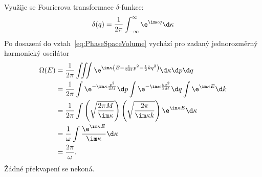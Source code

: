 \begin{solution}
    Využije se Fourierova transformace $\delta$-funkce:
    \begin{equation}
        \delta(q)
            =\frac{1}{2\pi}\int_{-\infty}^{\infty}\e^{\im\kappa q}\d\kappa
    \end{equation}
    Po dosazení do vztah~\eqref{eq:PhaseSpaceVolume} vychází pro zadaný jednorozměrný harmonický oscilátor
    \begin{align}
        \Omega(E)
            &=\frac{1}{2\pi}\iiint\e^{\im\kappa\left(E-\frac{1}{2M}p^{2}-\frac{1}{2}kq^{2}\right)}\d\kappa\d p\d q\nonumber\\
            &=\frac{1}{2\pi}\int\e^{-\im\kappa\frac{p^{2}}{2M}}\d p
                \int\e^{-\im\kappa\frac{kq^{2}}{2M}}\d q
                \int\e^{\im\kappa E}\d k\nonumber\\
            &=\frac{1}{2\pi}\int\left(\sqrt{\frac{2\pi M}{\im\kappa}}\right)
                \left(\sqrt{\frac{2\pi}{\im\kappa k}}\right)\e^{\im\kappa E}\d\kappa\nonumber\\
            &=\frac{1}{\omega}\int\frac{\e^{\im\kappa E}}{\im\kappa}\d\kappa\nonumber\\
            &=\frac{2\pi}{\omega}.
    \end{align}
    Žádné překvapení se nekoná.
\end{solution}
